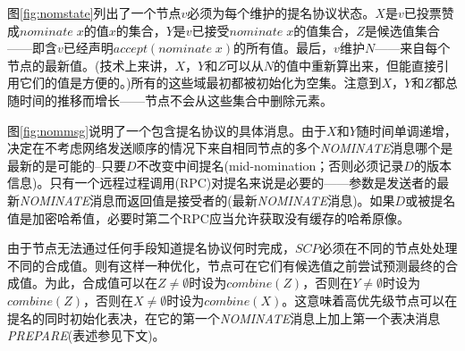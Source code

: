 {图\ref{fig:nomstate}}列出了一个节点$v$必须为每个{\slot}维护的提名协议状态。$X$是$v$已投票赞成$nominate\;x$的值$x$的集合，$Y$是$v$已接受$nominate\;x$的值集合，$Z$是候选值集合——即含$v${\quorum}已经声明$accept(nominate\;x)$的所有值。最后，$v$维护$N$——来自每个节点的最新值。(技术上来讲，$X$，$Y$和$Z$可以从$N$的值中重新算出来，但能直接引用它们的值是方便的。)所有的这些域最初都被初始化为空集。注意到$X$，$Y$和$Z$都总随时间的推移而增长——节点不会从这些集合中删除元素。

{图\ref{fig:nommsg}}说明了一个包含提名协议的具体消息。由于$X$和$Y$随时间单调递增，决定在不考虑网络发送顺序的情况下来自相同节点的多个\textsl{NOMINATE}消息哪个是最新的是可能的--只要$D$不改变中间提名(mid-nomination；否则必须记录$D$的版本信息)。只有一个远程过程调用(RPC)对提名来说是必要的——参数是发送者的最新\textsl{NOMINATE}消息而返回值是接受者的(最新\textsl{NOMINATE}消息{})。如果$D$或被提名值是加密哈希值，必要时第二个RPC应当允许获取没有缓存的哈希原像。

由于节点无法通过任何手段知道提名协议何时完成，$SCP$必须在不同的节点处处理不同的合成值。则有这样一种优化，节点可在它们有候选值之前尝试预测最终的合成值。为此，合成值可以在$Z\neq \emptyset$时设为$combine(Z)$，否则在$Y\neq \emptyset$时设为$combine(Z)$，否则在$X\neq \emptyset$时设为$combine(X)$。这意味着高优先级节点可以在提名的同时初始化表决，在它的第一个\textsl{NOMINATE}消息上加上第一个表决消息\textsl{PREPARE}(表述参见下文)。